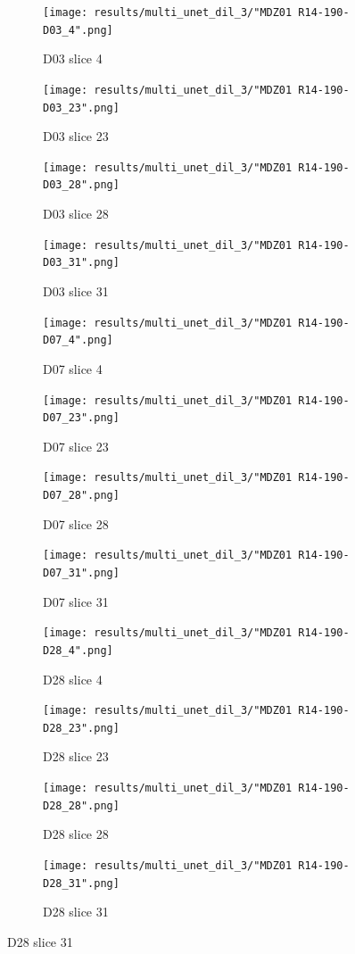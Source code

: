 \begin{figure}[!htb]  
    \centering %
\begin{subfigure}{0.25\textwidth}
  \texttt{[image: results/multi\_unet\_dil\_3/"MDZ01 R14-190-D03\_4".png]}
  \caption{D03 slice 4}
\end{subfigure}\hfil %
\begin{subfigure}{0.25\textwidth}
  \texttt{[image: results/multi\_unet\_dil\_3/"MDZ01 R14-190-D03\_23".png]}
  \caption{D03 slice 23}
\end{subfigure}\hfil %
\begin{subfigure}{0.25\textwidth}
  \texttt{[image: results/multi\_unet\_dil\_3/"MDZ01 R14-190-D03\_28".png]}
  \caption{D03 slice 28}
\end{subfigure}\hfil %
\begin{subfigure}{0.25\textwidth}
  \texttt{[image: results/multi\_unet\_dil\_3/"MDZ01 R14-190-D03\_31".png]}
  \caption{D03 slice 31}
\end{subfigure}

\medskip
\begin{subfigure}{0.25\textwidth}
  \texttt{[image: results/multi\_unet\_dil\_3/"MDZ01 R14-190-D07\_4".png]}
  \caption{D07 slice 4}
\end{subfigure}\hfil %
\begin{subfigure}{0.25\textwidth}
  \texttt{[image: results/multi\_unet\_dil\_3/"MDZ01 R14-190-D07\_23".png]}
  \caption{D07 slice 23}
\end{subfigure}\hfil %
\begin{subfigure}{0.25\textwidth}
  \texttt{[image: results/multi\_unet\_dil\_3/"MDZ01 R14-190-D07\_28".png]}
  \caption{D07 slice 28}
\end{subfigure}\hfil %
\begin{subfigure}{0.25\textwidth}
  \texttt{[image: results/multi\_unet\_dil\_3/"MDZ01 R14-190-D07\_31".png]}
  \caption{D07 slice 31}
\end{subfigure}

\medskip
\begin{subfigure}{0.25\textwidth}
  \texttt{[image: results/multi\_unet\_dil\_3/"MDZ01 R14-190-D28\_4".png]}
  \caption{D28 slice 4}
\end{subfigure}\hfil %
\begin{subfigure}{0.25\textwidth}
  \texttt{[image: results/multi\_unet\_dil\_3/"MDZ01 R14-190-D28\_23".png]}
  \caption{D28 slice 23}
\end{subfigure}\hfil %
\begin{subfigure}{0.25\textwidth}
  \texttt{[image: results/multi\_unet\_dil\_3/"MDZ01 R14-190-D28\_28".png]}
  \caption{D28 slice 28}
\end{subfigure}\hfil %
\begin{subfigure}{0.25\textwidth}
  \texttt{[image: results/multi\_unet\_dil\_3/"MDZ01 R14-190-D28\_31".png]}
  \caption{D28 slice 31}
\end{subfigure}
  

\end{figure}
